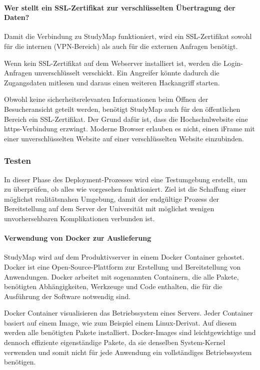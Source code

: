 \paragraph*{Wer stellt ein SSL-Zertifikat zur verschlüsselten Übertragung der Daten?}
Damit die Verbindung zu StudyMap funktioniert, wird ein SSL-Zertifikat sowohl für die internen (VPN-Bereich) als auch für die externen Anfragen benötigt.

Wenn kein SSL-Zertifikat auf dem Webserver installiert ist, werden die Login-Anfragen unverschlüsselt verschickt. Ein Angreifer könnte dadurch die Zugangsdaten mitlesen und daraus einen weiteren Hackangriff starten.

Obwohl keine sicherheitsrelevanten Informationen beim Öffnen der Besucheransicht geteilt werden, benötigt StudyMap auch für den öffentlichen Bereich ein SSL-Zertifikat. Der Grund dafür ist, dass die Hochschulwebsite eine https-Verbindung erzwingt. Moderne Browser erlauben es nicht, einen iFrame mit einer unverschlüsselten Website auf einer verschlüsselten Website einzubinden. \parencite{vyas_mixed_2013}

\subsubsection{Testen}
In dieser Phase des Deployment-Prozesses wird eine Testumgebung erstellt, um zu überprüfen, ob alles wie vorgesehen funktioniert. Ziel ist die Schaffung einer möglichst realitätsnahen Umgebung, damit der endgültige Prozess der Bereitstellung auf dem Server der Universität mit möglichst wenigen unvorhersehbaren Komplikationen verbunden ist.

\paragraph*{Verwendung von Docker zur Auslieferung}
StudyMap wird auf dem Produktivserver in einem Docker Container gehostet. Docker ist eine Open-Source-Plattform zur Erstellung und Bereitstellung von Anwendungen. Docker arbeitet mit sogenannten Containern, die alle Pakete, benötigten Abhängigkeiten, Werkzeuge und Code enthalten, die für die Ausführung der Software notwendig sind. \parencite{amazon_web_services_inc_was_2023}

Docker Container visualisieren das Betriebssystem eines Servers. Jeder Container basiert auf einem Image, wie zum Beispiel einem Linux-Derivat. Auf diesem werden alle benötigten Pakete installiert. Docker-Images sind leichtgewichtige und dennoch effiziente eigenständige Pakete, da sie denselben System-Kernel verwenden und somit nicht für jede Anwendung ein vollständiges Betriebssystem benötigen. \parencite{docker_inc_what_2024}


